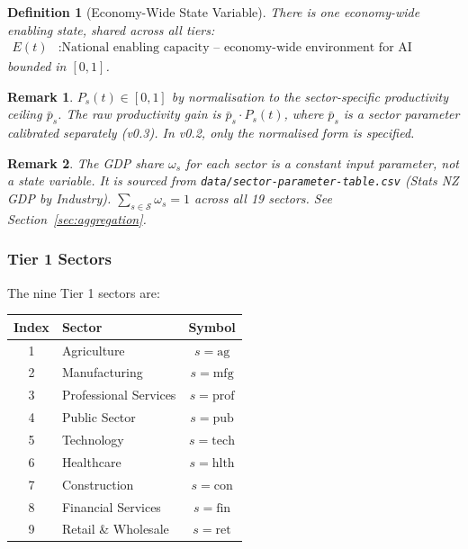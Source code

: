 \documentclass[11pt,a4paper]{article}
\newtheorem{definition}{Definition}
\newtheorem{remark}{Remark}
\begin{document}
\begin{definition}[Economy-Wide State Variable]
There is one economy-wide enabling state, shared across all tiers:
\begin{align}
E(t) &: \text{National enabling capacity -- economy-wide environment for AI adoption}
\end{align}
bounded in $[0,1]$.
\end{definition}

\begin{remark}
$P_s(t) \in [0,1]$ by normalisation to the sector-specific productivity ceiling $\bar{p}_s$. The raw productivity gain is $\bar{p}_s \cdot P_s(t)$, where $\bar{p}_s$ is a sector parameter calibrated separately (v0.3). In v0.2, only the normalised form is specified.
\end{remark}

\begin{remark}
The GDP share $\omega_s$ for each sector is a constant input parameter, not a state variable. It is sourced from \texttt{data/sector-parameter-table.csv} (Stats NZ GDP by Industry). $\sum_{s \in \mathcal{S}} \omega_s = 1$ across all 19 sectors. See Section~\ref{sec:aggregation}.
\end{remark}

\subsubsection*{Tier 1 Sectors}

The nine Tier 1 sectors are:

\begin{center}
\begin{tabular}{clc}
\toprule
Index & Sector & Symbol \\
\midrule
1 & Agriculture & $s = \text{ag}$ \\
2 & Manufacturing & $s = \text{mfg}$ \\
3 & Professional Services & $s = \text{prof}$ \\
4 & Public Sector & $s = \text{pub}$ \\
5 & Technology & $s = \text{tech}$ \\
6 & Healthcare & $s = \text{hlth}$ \\
7 & Construction & $s = \text{con}$ \\
8 & Financial Services & $s = \text{fin}$ \\
9 & Retail \& Wholesale & $s = \text{ret}$ \\
\bottomrule
\end{tabular}
\end{center}
\end{document}
